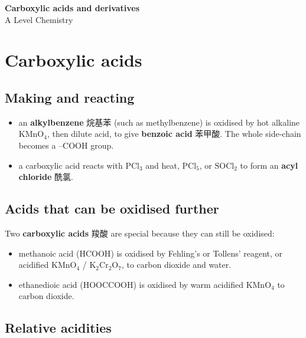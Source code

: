 \documentclass[11pt]{article}
\begin{document}
\begin{center}
  {\LARGE\bfseries Carboxylic acids and derivatives}\\[0.35em]
  {\large A Level Chemistry}
\end{center}
\vspace{0.6em}

\section*{Carboxylic acids}

\subsection*{Making and reacting}

\begin{itemize}
\item an \textbf{alkylbenzene} 烷基苯 (such as methylbenzene) is oxidised by hot alkaline $\text{KMnO}_4$, then dilute acid, to give \textbf{benzoic acid} 苯甲酸. The whole side-chain becomes a $\text{–COOH}$ group.

\item a carboxylic acid reacts with $\text{PCl}_3$ and heat, $\text{PCl}_5$, or $\text{SOCl}_2$ to form an \textbf{acyl chloride} 酰氯.

\end{itemize}

\subsection*{Acids that can be oxidised further}

Two \textbf{carboxylic acids} 羧酸 are special because they can still be oxidised:

\begin{itemize}
\item methanoic acid ($\text{HCOOH}$) is oxidised by Fehling's or Tollens' reagent, or acidified $\text{KMnO}_4$ / $\text{K}_2\text{Cr}_2\text{O}_7$, to carbon dioxide and water.

\item ethanedioic acid ($\text{HOOCCOOH}$) is oxidised by warm acidified $\text{KMnO}_4$ to carbon dioxide.

\end{itemize}

\subsection*{Relative acidities}
\end{document}
